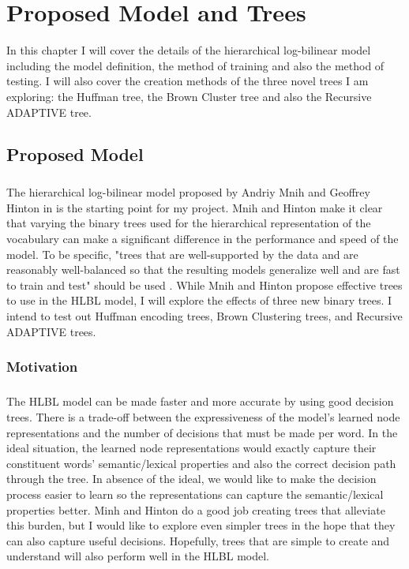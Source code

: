 \chapter{Proposed Model and Trees}
In this chapter I will cover the details of the hierarchical log-bilinear model including the model definition, the method of training and also the method of testing. I will also cover the creation methods of the three novel trees I am exploring: the Huffman tree, the Brown Cluster tree and also the Recursive ADAPTIVE tree.

\section{Proposed Model} \label{sec:proposedModel}
\paragraph{}
The hierarchical log-bilinear model proposed by Andriy Mnih and Geoffrey Hinton in \cite{MnihHinton2009} is the starting point for my project. Mnih and Hinton make it clear that varying the binary trees used for the hierarchical representation of the vocabulary can make a significant difference in the performance and speed of the model. To be specific, "trees
that are well-supported by the data and are reasonably well-balanced so that the resulting models
generalize well and are fast to train and test" should be used \cite[pg. 5]{MnihHinton2009}. While Mnih and Hinton propose  effective trees to use in the HLBL model, I will explore the effects of three new binary trees. I intend to test out Huffman encoding trees, Brown Clustering trees, and Recursive ADAPTIVE trees.
\subsection{Motivation}
\paragraph{}
The HLBL model can be made faster and more accurate by using good decision trees. There is a trade-off between the expressiveness of the model's learned node representations and the number of decisions that must be made per word. In the ideal situation, the learned node representations would exactly capture their constituent words' semantic/lexical properties and also the correct decision path through the tree. In absence of the ideal, we would like to make the decision process easier to learn so the representations can capture the semantic/lexical properties better. Minh and Hinton do a good job creating trees that alleviate this burden, but I would like to explore even simpler trees in the hope that they can also capture useful decisions. Hopefully, trees that are simple to create and understand will also perform well in the HLBL model. 

